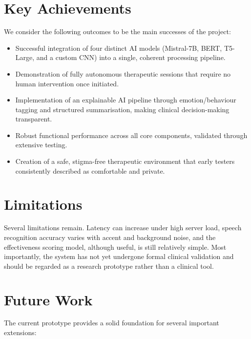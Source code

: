 \section{Key Achievements}

We consider the following outcomes to be the main successes of the project:

\begin{itemize}
    \item Successful integration of four distinct AI models (Mistral-7B, BERT, T5-Large, and a custom CNN) into a single, coherent processing pipeline.
    \item Demonstration of fully autonomous therapeutic sessions that require no human intervention once initiated.
    \item Implementation of an explainable AI pipeline through emotion/behaviour tagging and structured summarisation, making clinical decision-making transparent.
    \item Robust functional performance across all core components, validated through extensive testing.
    \item Creation of a safe, stigma-free therapeutic environment that early testers consistently described as comfortable and private.
\end{itemize}

\section{Limitations}

Several limitations remain. Latency can increase under high server load, speech recognition accuracy varies with accent and background noise, and the effectiveness scoring model, although useful, is still relatively simple. Most importantly, the system has not yet undergone formal clinical validation and should be regarded as a research prototype rather than a clinical tool.

\section{Future Work}

The current prototype provides a solid foundation for several important extensions:

